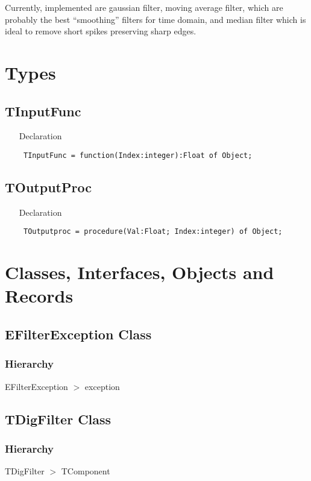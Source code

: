 \documentclass[12pt,a4paper,oneside]{report}
\newcommand{\declarationitem}[1]{{\addfontfeatures{FakeBold=1.3} #1}}
\newcommand{\code}[1]{\texttt{#1}}
\begin{document}
Currently, implemented are gaussian filter, moving average filter, which are probably the best ``smoothing'' filters for time domain, and median filter which is ideal to remove short spikes preserving sharp edges.

\section{Types}
\subsection{TInputFunc}
\label{lmfilters-TInputFunc}
\begin{itemize}\item[\declarationitem{Declaration}\hfill]
	\begin{flushleft}
		\code{
			TInputFunc = function(Index:integer):Float of Object;}
	\end{flushleft}
\end{itemize}
\subsection{TOutputProc}
\label{lmfilters-TOutputproc}
\begin{itemize}\item[\declarationitem{Declaration}\hfill]
	\begin{flushleft}
		\code{
			TOutputproc = procedure(Val:Float; Index:integer) of Object;}
	\end{flushleft}
\end{itemize}
\section{Classes, Interfaces, Objects and Records}
\subsection{EFilterException Class}
\label{lmfilters.EFilterException}
\subsubsection{Hierarchy}
EFilterException {$>$} exception
\subsection{TDigFilter Class}
\label{lmfilters.TDigFilter}
\subsubsection{Hierarchy}
TDigFilter {$>$} TComponent
\end{document}
